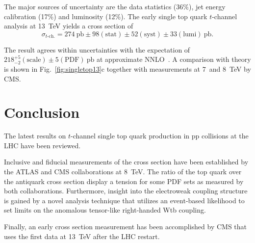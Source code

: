 \documentclass{PoS}
\begin{document}
The major sources of uncertainty are the data statistics (36\%), jet energy calibration (17\%) and luminosity (12\%).
The early single top quark $t$-channel analysis at 13~TeV yields a cross section of
\begin{equation}
\sigma_{t\mbox{-}\mathrm{ch.}}=274~\mathrm{pb}\pm98\mathrm{(stat)}\pm52\mathrm{(syst)}\pm33\mathrm{(lumi)}~\mathrm{pb}.
\end{equation}

The result agrees within uncertainties with the expectation of $218_{-2}^{+5}\mathrm{(scale)}\pm5\mathrm{(PDF)}~\mathrm{pb}$ at approximate NNLO~\cite{Kidonakis-8tev}. A comparison with theory is shown in Fig.~\ref{fig:singletop13}c together with measurements at 7~and 8~TeV by CMS.

\section{Conclusion}
The latest results on $t$-channel single top quark production in pp collisions at the LHC have been reviewed.

Inclusive and fiducial measurements of the cross section have been established by the ATLAS and CMS collaborations at 8~TeV. The ratio of the top quark over the antiquark cross section display a tension for some PDF sets as measured by both collaborations. Furthermore, insight into the electroweak coupling structure is gained by a novel analysis technique that utilizes an event-based likelihood to set limits on the anomalous tensor-like right-handed Wtb coupling.

Finally, an early cross section measurement has been accomplished by CMS that uses the first data at 13~TeV after the LHC restart.
\end{document}
